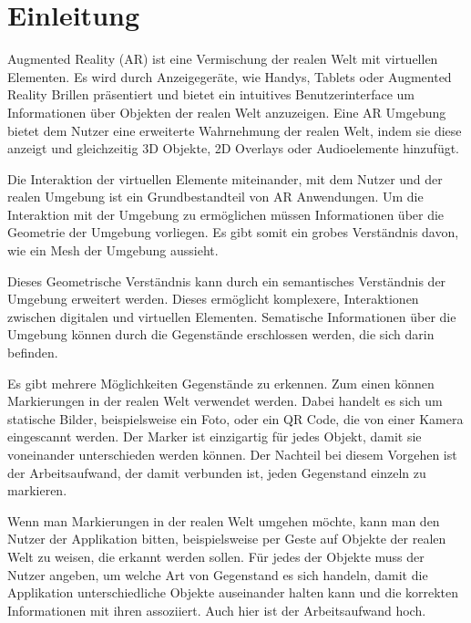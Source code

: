 \section{Einleitung}

Augmented Reality (AR) ist eine Vermischung der realen Welt mit virtuellen Elementen. Es wird durch Anzeigegeräte, wie Handys, Tablets oder Augmented Reality Brillen präsentiert und bietet ein intuitives Benutzerinterface um Informationen über Objekten der realen Welt anzuzeigen. Eine AR Umgebung bietet dem Nutzer eine erweiterte Wahrnehmung der realen Welt, indem sie diese anzeigt und gleichzeitig 3D Objekte, 2D Overlays oder Audioelemente  hinzufügt. %

Die Interaktion der virtuellen Elemente miteinander, mit dem Nutzer und der realen Umgebung ist ein Grundbestandteil von AR Anwendungen.
Um die Interaktion mit der Umgebung zu ermöglichen müssen Informationen über die Geometrie der Umgebung vorliegen. Es gibt somit ein grobes Verständnis davon, wie ein Mesh der Umgebung aussieht. 

Dieses Geometrische Verständnis kann durch ein semantisches Verständnis der Umgebung erweitert werden. Dieses ermöglicht komplexere, Interaktionen zwischen digitalen und virtuellen Elementen. Sematische Informationen über die Umgebung können durch die Gegenstände erschlossen werden, die sich darin befinden.

Es gibt mehrere Möglichkeiten Gegenstände zu erkennen. Zum einen können Markierungen in der realen Welt verwendet werden. Dabei handelt es sich um statische Bilder, beispielsweise ein Foto, oder ein QR Code, die von einer Kamera eingescannt werden. Der Marker ist einzigartig für jedes Objekt, damit sie voneinander unterschieden werden können. Der Nachteil bei diesem Vorgehen ist der Arbeitsaufwand, der damit verbunden ist, jeden Gegenstand einzeln zu markieren.%

Wenn man Markierungen in der realen Welt umgehen möchte, kann man den Nutzer der Applikation bitten, beispielsweise per Geste auf Objekte der realen Welt zu weisen, die erkannt werden sollen. Für jedes der Objekte muss der Nutzer angeben, um welche Art von Gegenstand es sich handeln, damit die Applikation unterschiedliche Objekte auseinander halten kann und die korrekten Informationen mit ihren assoziiert. Auch hier ist der Arbeitsaufwand hoch.

